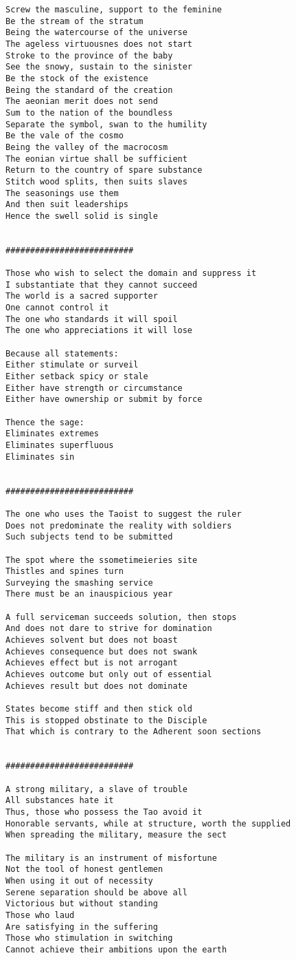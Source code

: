 \documentclass[12pt,a4paper,oneside]{book}
\begin{document}
\begin{verbatim}
Screw the masculine, support to the feminine
Be the stream of the stratum
Being the watercourse of the universe
The ageless virtuousnes does not start
Stroke to the province of the baby
See the snowy, sustain to the sinister
Be the stock of the existence
Being the standard of the creation
The aeonian merit does not send
Sum to the nation of the boundless
Separate the symbol, swan to the humility
Be the vale of the cosmo
Being the valley of the macrocosm
The eonian virtue shall be sufficient
Return to the country of spare substance
Stitch wood splits, then suits slaves
The seasonings use them
And then suit leaderships
Hence the swell solid is single


##########################

Those who wish to select the domain and suppress it
I substantiate that they cannot succeed
The world is a sacred supporter
One cannot control it
The one who standards it will spoil
The one who appreciations it will lose

Because all statements:
Either stimulate or surveil
Either setback spicy or stale
Either have strength or circumstance
Either have ownership or submit by force

Thence the sage:
Eliminates extremes
Eliminates superfluous
Eliminates sin


##########################

The one who uses the Taoist to suggest the ruler
Does not predominate the reality with soldiers
Such subjects tend to be submitted

The spot where the ssometimeieries site
Thistles and spines turn
Surveying the smashing service
There must be an inauspicious year

A full serviceman succeeds solution, then stops
And does not dare to strive for domination
Achieves solvent but does not boast
Achieves consequence but does not swank
Achieves effect but is not arrogant
Achieves outcome but only out of essential
Achieves result but does not dominate

States become stiff and then stick old
This is stopped obstinate to the Disciple
That which is contrary to the Adherent soon sections


##########################

A strong military, a slave of trouble
All substances hate it
Thus, those who possess the Tao avoid it
Honorable servants, while at structure, worth the supplied
When spreading the military, measure the sect

The military is an instrument of misfortune
Not the tool of honest gentlemen
When using it out of necessity
Serene separation should be above all
Victorious but without standing
Those who laud
Are satisfying in the suffering
Those who stimulation in switching
Cannot achieve their ambitions upon the earth


\end{verbatim}
\end{document}
